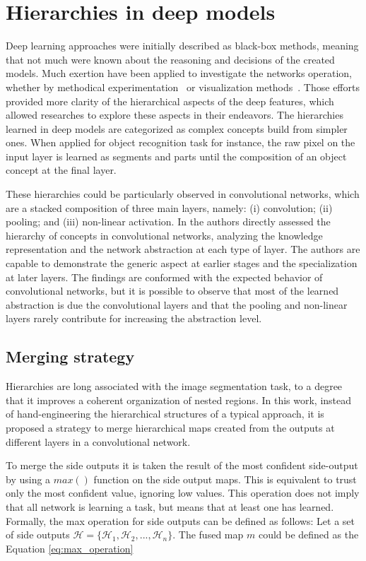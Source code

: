 \section{Hierarchies in deep models}
\label{sec:method}


Deep learning approaches were initially described as black-box methods, meaning that not much were known about the reasoning and decisions of the created models. Much exertion have been applied to investigate the networks operation, whether by methodical experimentation~\cite{ilin17,kuo16,eigen14,zhang17} or visualization methods~\cite{simonyan13,zeiler14,alsallakh18}. Those efforts provided more clarity of the hierarchical aspects of the deep features, which allowed researches to explore these aspects in their endeavors. The  hierarchies learned in deep models are categorized as complex concepts build from simpler ones. When applied for object recognition task for instance, the raw pixel on the input layer is learned as segments and parts until the composition of an object concept at the final layer.  

These hierarchies could be particularly observed in convolutional networks, which are a stacked composition of three main layers, namely: (i) convolution; (ii) pooling; and (iii) non-linear activation. In \cite{ilin17} the authors directly assessed the hierarchy of concepts in convolutional networks, analyzing the knowledge representation and the network abstraction at each type of layer.  The authors are capable to demonstrate the generic aspect at earlier stages and the specialization at later layers. The findings are conformed with the expected behavior of convolutional networks, but it is possible to observe that most of the learned abstraction is due the convolutional layers and that the pooling and non-linear layers rarely contribute for increasing  the abstraction level.


\subsection{Merging strategy}

Hierarchies are long associated with the image segmentation task, to a degree that it improves a coherent organization of nested regions. In this work, instead of hand-engineering the hierarchical structures of a typical approach, it is proposed a strategy to merge hierarchical maps created from the outputs at different layers in a convolutional network. 

To merge the side outputs it is taken the result of the most confident side-output by using a $max()$ function on the side output maps. This is equivalent to trust only the most confident value, ignoring low values. This operation does not imply that all network is learning a task, but means that at least one has learned. Formally, the max operation for side outputs can be defined as follows: Let a set of side outputs $\mathcal{H} = \{\mathcal{H}_1,\mathcal{H}_2,..., \mathcal{H}_n\}$. The fused map $m$ could be defined as the Equation \ref{eq:max_operation}


